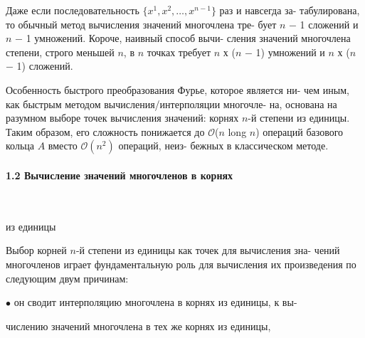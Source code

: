 \vspace{0pt}Даже если последовательность $\{x^1, x^2, \dots, x^{n - 1}\}$ раз и навсегда за- \linebreak
табулирована, то обычный метод вычисления значений многочлена тре­- \linebreak
бует $n$ $-$ 1 сложений и $n$ $-$ 1 умножений. Короче, наивный способ вычи­- \linebreak
сления значений многочлена степени, строго меньшей $n$, в $n$ точках \linebreak
требует $n$ х ($n$ $-$ 1) умножений и $n$ х ($n$ $-$ 1) сложений. \ 

\vspace{0pt}Особенность быстрого преобразования Фурье, которое является ни­- \linebreak
чем иным, как быстрым методом вычисления/интерполяции многочле­- \linebreak
на, основана на разумном выборе точек вычисления значений: корнях \linebreak
$n$-й степени из единицы. Таким образом, его сложность понижается до \linebreak
$\mathcal{O}$($n$ long $n$) операций базового кольца $A$ вместо $\mathcal{O}(n^2)$ операций, неиз­- \linebreak
бежных в классическом методе.

\paragraph{ 1.2 Вычисление значений многочленов в корнях} \ 

\vspace{0pt} \hspace{10pt}$\mathbf{из}$ $\mathbf{единицы}$ \  

\vspace{8pt}\noindent Выбор корней $n$-й степени из единицы как точек для вычисления зна­- \linebreak
чений многочленов играет фундаментальную роль для вычисления их \linebreak
произведения по следующим двум причинам:\ 

\vspace{3pt}$\bullet$ \hspace{3pt}он сводит интерполяцию многочлена в корнях из единицы, к вы­- \ 

\vspace{0pt}\hspace{8pt} числению значений многочлена в тех же корнях из единицы, \ 

